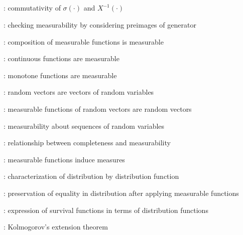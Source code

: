 \subsection*{}
\item {}: commutativity of \(\sigma(\cdot)\) and \(X^{-1}(\cdot)\)
\item {}: checking measurability by
considering preimages of generator
\item {}: composition of measurable functions is
measurable
\item {}: continuous functions are measurable
\item {}: monotone functions are measurable
\item {}: random vectors are vectors of random variables
\item {}: measurable functions of random vectors are random vectors
\item {}: measurability about sequences of random variables
\item {}: relationship between completeness and
measurability
\item {}: measurable functions induce measures
\item {}: characterization of distribution by distribution function
\item {}: preservation of equality in distribution after applying
measurable functions
\item {}: expression of survival functions in terms of distribution functions
\item {}: Kolmogorov's extension theorem
